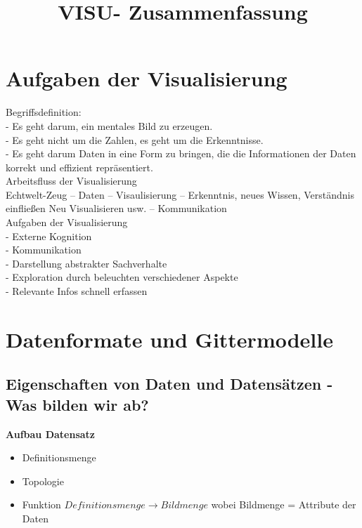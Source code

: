 \documentclass{article}
\title{\vspace{-5mm}%
	\fontsize{24pt}{10pt}\selectfont
	\textbf{VISU- Zusammenfassung}
}
\begin{document}
\maketitle	
\pagebreak

\tableofcontents
\pagebreak


\section{Aufgaben der Visualisierung}
Begriffsdefinition: \\
- Es geht darum, ein mentales Bild zu erzeugen.\\
- Es geht nicht um die Zahlen, es geht um die Erkenntnisse.\\
- Es geht darum Daten in eine Form zu bringen, die die Informationen der Daten korrekt und effizient repräsentiert.\\

\noindent Arbeitsfluss der Visualisierung\\
Echtwelt-Zeug -- Daten -- Visaulisierung -- Erkenntnis, neues Wissen, Verständnis einfließen Neu Visualisieren usw. -- Kommunikation\\

\noindent Aufgaben der Visualisierung\\
- Externe Kognition\\
- Kommunikation\\
- Darstellung abstrakter Sachverhalte\\
- Exploration durch beleuchten verschiedener Aspekte\\
- Relevante Infos schnell erfassen\\

\pagebreak

\section{Datenformate und Gittermodelle}
\subsection{Eigenschaften von Daten und Datensätzen - Was bilden wir ab?} 

\textbf{Aufbau Datensatz}
\begin{itemize}[noitemsep]
	\item Definitionsmenge
	\item Topologie
	\item Funktion $Definitionsmenge \rightarrow Bildmenge$ wobei Bildmenge = Attribute der Daten
\end{itemize}
\end{document}
